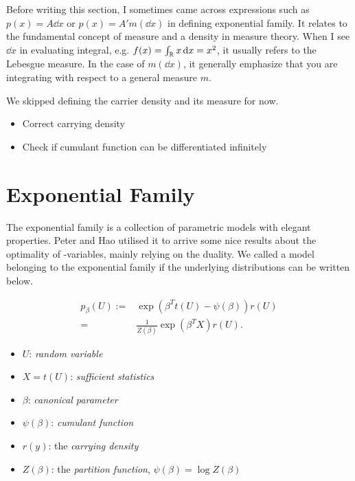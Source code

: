 \clearpage




Before writing this section, I sometimes came across expressions such as
$p(x) = A \dd{x}$ or $p(x) = A' m(\dd{x})$ in defining exponential family.
It relates to the fundamental concept of measure and a density in measure theory.
When I see $\dd{x}$ in evaluating integral, e.g. $f(x) = \int_{\mathbb{R}} x \dd{x} = x^2$,
it usually refers to the Lebesgue measure.
In the case of $m(\dd{x})$, it generally emphasize that you are integrating
with respect to a general measure $m$.

We skipped defining the carrier density and its measure for now.


\begin{itemize}
	\item Correct carrying density
	\item Check if cumulant function can be differentiated infinitely
\end{itemize}

\section{Exponential Family}

The exponential family is a collection of parametric models with elegant properties.
Peter and Hao utilised it to arrive some nice results about
the optimality of \E-variables, mainly relying on the duality.
We called a model belonging to the exponential family
if the underlying distributions can be written below.


\begin{define}
	\begin{align}\label{eq:exp-family}
		p_\beta(U)
		:= & \exp\left(\beta^T t(U) - \psi(\beta)\right) r(U) \\
		=  & \frac{1}{Z(\beta)} \exp(\beta^T X) r(U).
	\end{align}
\end{define}

\begin{itemize}
	\item $U$: \emph{random variable}
	\item $X=t(U)$: \emph{sufficient statistics}
	\item $\beta$: \emph{canonical parameter}
	\item $\psi(\beta)$: \emph{cumulant function}
	\item $r(y)$: the \emph{carrying density}
	\item $Z(\beta)$: the \emph{partition function}, $\psi(\beta)=\log Z(\beta)$
\end{itemize}

